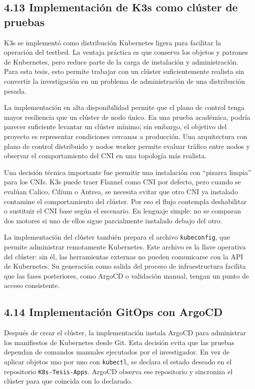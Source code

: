 \subsection{4.13 Implementación de K3s como clúster de pruebas}

K3s se implementó como distribución Kubernetes ligera para facilitar la operación del testbed. La ventaja práctica es que conserva los objetos y patrones de Kubernetes, pero reduce parte de la carga de instalación y administración. Para esta tesis, esto permite trabajar con un clúster suficientemente realista sin convertir la investigación en un problema de administración de una distribución pesada.

La implementación en alta disponibilidad permite que el plano de control tenga mayor resiliencia que un clúster de nodo único. En una prueba académica, podría parecer suficiente levantar un clúster mínimo; sin embargo, el objetivo del proyecto es representar condiciones cercanas a producción. Una arquitectura con plano de control distribuido y nodos worker permite evaluar tráfico entre nodos y observar el comportamiento del CNI en una topología más realista.

Una decisión técnica importante fue permitir una instalación con ``pizarra limpia'' para los CNIs. K3s puede traer Flannel como CNI por defecto, pero cuando se evalúan Calico, Cilium o Antrea, se necesita evitar que otro CNI ya instalado contamine el comportamiento del clúster. Por eso el flujo contempla deshabilitar o sustituir el CNI base según el escenario. En lenguaje simple: no se comparan dos motores si uno de ellos sigue parcialmente instalado debajo del otro.

La implementación del clúster también prepara el archivo \texttt{kubeconfig}, que permite administrar remotamente Kubernetes. Este archivo es la llave operativa del clúster: sin él, las herramientas externas no pueden comunicarse con la API de Kubernetes. Su generación como salida del proceso de infraestructura facilita que las fases posteriores, como ArgoCD o validación manual, tengan un punto de acceso consistente.

\subsection{4.14 Implementación GitOps con ArgoCD}

Después de crear el clúster, la implementación instala ArgoCD para administrar los manifiestos de Kubernetes desde Git. Esta decisión evita que las pruebas dependan de comandos manuales ejecutados por el investigador. En vez de aplicar objetos uno por uno con \texttt{kubectl}, se declara el estado deseado en el repositorio \texttt{K8s-Tesis-Apps}. ArgoCD observa ese repositorio y sincroniza el clúster para que coincida con lo declarado.

